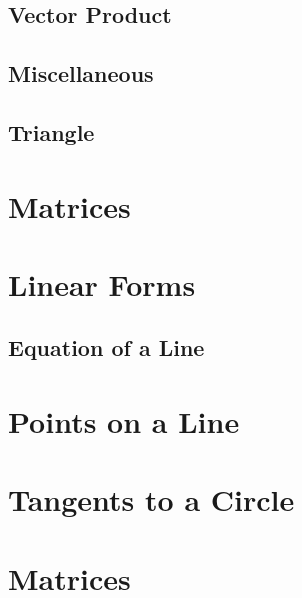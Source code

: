 \documentclass[journal]{IEEEtran}
\begin{document}
\subsection{Vector Product}

\newpage
\subsection{Miscellaneous}

\newpage
\subsection{Triangle}

%
\newpage
\section{Matrices}

\newpage
\section{Linear Forms}
\subsection{Equation of a Line}

\appendices
\section{Points on a Line}

\newpage
\section{Tangents to a Circle}

\section{Matrices}

\end{document}
